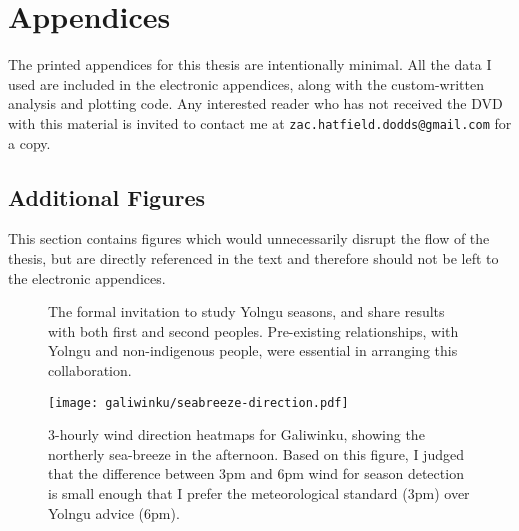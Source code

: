 \chapter{Appendices}
\label{ch:appendices}

The printed appendices for this thesis are intentionally minimal.
All the data I used are included in the electronic appendices,
along with the custom-written analysis and plotting code.
Any interested reader who has not received the DVD with this material is
invited to contact me at \texttt{zac.hatfield.dodds@gmail.com} for a copy.


\section*{Additional Figures}
This section contains figures which would unnecessarily disrupt the
flow of the thesis, but are directly referenced in the text and therefore
should not be left to the electronic appendices.


\begin{figure}[p]
    \centering
    \caption[Letter of invitation for collaborative research]{
        The formal invitation to study Yolngu seasons,
        and share results with both first and second peoples.
        Pre-existing relationships, with Yolngu and non-indigenous people,
        were essential in arranging this collaboration.
        }
    \label{app:invitation-letter}
\end{figure}

\begin{figure}[p]
    \centering
    \texttt{[image: galiwinku/seabreeze-direction.pdf]}
    \caption[3-hourly wind direction heatmaps, Galiwinku]{
        3-hourly wind direction heatmaps for Galiwinku,
        showing the northerly sea-breeze in the afternoon.
        Based on this figure, I judged that the difference between
        3pm and 6pm wind for season detection is small enough that
        I prefer the meteorological standard (3pm) over Yolngu advice (6pm).}
    \label{fig:galiwinku-seabreeze-direction}
\end{figure}

